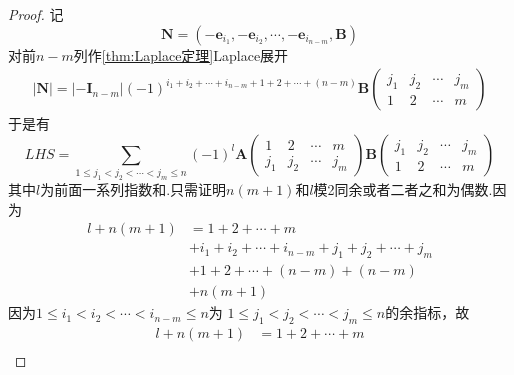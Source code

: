 {\begin{proof}
        记\[
            \bm{N}=\left(-\bm{e}_{i_1},-\bm{e}_{i_2},\cdots,-\bm{e}_{i_{n-m}},\bm{B}\right)
        \]
        对前$n-m$列作\cref{thm:Laplace定理}Laplace展开
        \begin{align*}
            \left|\bm{N}\right|=\left|-\bm{I}_{n-m}\right|
            \left(-1\right)^{i_1+i_2+\cdots+i_{n-m}+1+2+\cdots+\left(n-m\right)}\bm{B}\begin{pmatrix}
                                                                                          j_1 & j_2 & \cdots & j_m \\
                                                                                          1   & 2   & \cdots & m
                                                                                      \end{pmatrix}
        \end{align*}
        于是有
        \[
            LHS = \sum_{1\leqslant j_1<j_2<\cdots<j_m\leqslant n}
            \left(-1\right)^l\bm{A}\begin{pmatrix}
                1   & 2   & \cdots & m   \\
                j_1 & j_2 & \cdots & j_m
            \end{pmatrix}\bm{B}\begin{pmatrix}
                j_1 & j_2 & \cdots & j_m \\
                1   & 2   & \cdots & m
            \end{pmatrix}
        \]
        其中$l$为前面一系列指数和.只需证明$n\left(m+1\right)$和$l$模2同余或者二者之和为偶数.因为
        \begin{align*}
            l+n\left(m+1\right) & =
            1+2+\cdots+m                                                        \\
                                & +i_1+i_2+\cdots+i_{n-m}+j_1+j_2+\cdots+j_m    \\
                                & +1+2+\cdots+\left(n-m\right)+\left(n-m\right)
            \\
                                & +n\left(m+1\right)
        \end{align*}
        因为$1\leqslant i_1
            <i_2<\cdots<i_{n-m}
            \leqslant n$为
        $1\leqslant j_1
            <j_2<\cdots<j_m
            \leqslant n$的余指标，故
        \begin{align*}
            l+n\left(m+1\right) & =
            1+2+\cdots+m                                                                                                   \\

\end{align*}
\end{proof}}
